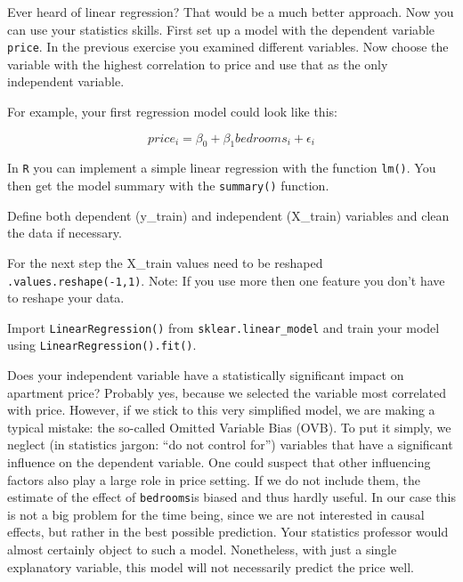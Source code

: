 \documentclass[
  11pt,
]{book}
\newenvironment{tips}[1]
  {
  \begin{itemize}
  \footnotesize
  \renewcommand{\labelitemi}{
    \raisebox{-.7\height}[0pt][0pt]{
      {\setkeys{Gin}{width=3em,keepaspectratio}
        \texttt{[image: images/\#1.png]}}
    }
  }
  \setlength{\fboxsep}{1em}
  \begin{rbox}
  \item
  }
  {
  \end{rbox}
  \end{itemize}
  }
\newenvironment{tipsp}[1]
  {
  \begin{itemize}
  \footnotesize
  \renewcommand{\labelitemi}{
    \raisebox{-.7\height}[0pt][0pt]{
      {\setkeys{Gin}{width=3em,keepaspectratio}
        \texttt{[image: images/\#1.png]}}
    }
  }
  \setlength{\fboxsep}{1em}
  \begin{pbox}
  \item
  }
  {
  \end{pbox}
  \end{itemize}
  }
\begin{document}
Ever heard of linear regression? That would be a much better approach. Now you can use your statistics skills. First set up a model with the dependent variable \texttt{price}. In the previous exercise you examined different variables. Now choose the variable with the highest correlation to price and use that as the only independent variable.

For example, your first regression model could look like this:

\[price_i = \beta_0 + \beta_1 bedrooms_i + \epsilon_i\]

\begin{tips}r

In \texttt{R} you can implement a simple linear regression with the function \texttt{lm()}. You then get the model summary with the \texttt{summary()} function.

\end{tips}

\begin{tipsp}p

Define both dependent (y\_train) and independent (X\_train) variables and clean the data if necessary.

For the next step the X\_train values need to be reshaped \texttt{.values.reshape(-1,1)}.
Note: If you use more then one feature you don't have to reshape your data.

Import \texttt{LinearRegression()} from \texttt{sklear.linear\_model} and train your model using \texttt{LinearRegression().fit()}.

\end{tipsp}

Does your independent variable have a statistically significant impact on apartment price? Probably yes, because we selected the variable most correlated with price. However, if we stick to this very simplified model, we are making a typical mistake: the so-called Omitted Variable Bias (OVB). To put it simply, we neglect (in statistics jargon: ``do not control for'') variables that have a significant influence on the dependent variable. One could suspect that other influencing factors also play a large role in price setting. If we do not include them, the estimate of the effect of \texttt{bedrooms}is biased and thus hardly useful. In our case this is not a big problem for the time being, since we are not interested in causal effects, but rather in the best possible prediction. Your statistics professor would almost certainly object to such a model. Nonetheless, with just a single explanatory variable, this model will not necessarily predict the price well.
\end{document}
